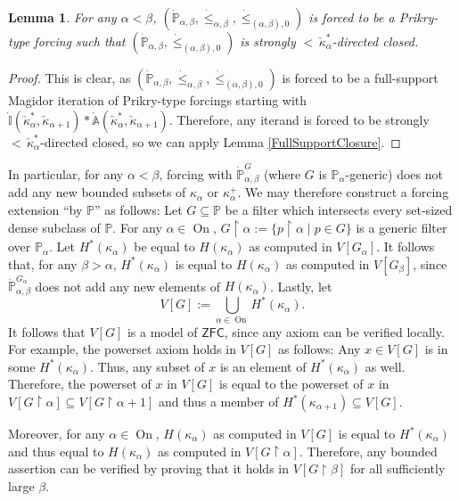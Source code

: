 \documentclass[a4paper]{amsart}
\theoremstyle{definition}
\theoremstyle{remark}
\theoremstyle{plain}
\newtheorem{mylem}[mydef]{Lemma}
\numberwithin{mydef}{section}
\DeclareMathOperator{\On}{On}
\newcommand{\dA}{\mathbb{A}}
\newcommand{\dI}{\mathbb{I}}
\newcommand{\dP}{\mathbb{P}}
\newcommand{\uhr}{\upharpoonright}
\newcommand{\ZFC}{\mathsf{ZFC}}
\begin{document}
	\begin{mylem}\label{TailClosure}
		For any $\alpha<\beta$, $(\dot{\dP}_{\alpha,\beta},\dot{\leq}_{\alpha,\beta},\dot{\leq}_{(\alpha,\beta),0})$ is forced to be a Prikry-type forcing such that $(\dot{\dP}_{\alpha,\beta},\dot{\leq}_{(\alpha,\beta),0})$ is strongly ${<}\,\check{\kappa}_{\alpha}^*$-directed closed.
	\end{mylem}
	
	\begin{proof}
		This is clear, as $(\dot{\dP}_{\alpha,\beta},\dot{\leq}_{\alpha,\beta},\dot{\leq}_{(\alpha,\beta),0})$ is forced to be a full-support Magidor iteration of Prikry-type forcings starting with $\dot{\dI}(\check{\kappa}_{\alpha}^*,\check{\kappa}_{\alpha+1})*\dot{\dA}(\check{\kappa}_{\alpha}^*,\check{\kappa}_{\alpha+1})$. Therefore, any iterand is forced to be strongly ${<}\,\check{\kappa}_{\alpha}^*$-directed closed, so we can apply Lemma \ref{FullSupportClosure}.
	\end{proof}
	
	In particular, for any $\alpha<\beta$, forcing with $\dot{\dP}_{\alpha,\beta}^G$ (where $G$ is $\dP_{\alpha}$-generic) does not add any new bounded subsets of $\kappa_{\alpha}$ or $\kappa_{\alpha}^+$. We may therefore construct a forcing extension ``by $\dP$'' as follows: Let $G\subseteq\dP$ be a filter which intersects every set-sized dense subclass of $\dP$. For any $\alpha\in\On$, $G\uhr\alpha:=\{p\uhr\alpha\;|\;p\in G\}$ is a generic filter over $\dP_{\alpha}$. Let $H^*(\kappa_{\alpha})$ be equal to $H(\kappa_{\alpha})$ as computed in $V[G_{\alpha}]$. It follows that, for any $\beta>\alpha$, $H^*(\kappa_{\alpha})$ is equal to $H(\kappa_{\alpha})$ as computed in $V[G_{\beta}]$, since $\dot{\dP}_{\alpha,\beta}^{G_{\alpha}}$ does not add any new elements of $H(\kappa_{\alpha})$. Lastly, let
	$$V[G]:=\bigcup_{\alpha\in\On}H^*(\kappa_{\alpha}).$$
	It follows that $V[G]$ is a model of $\ZFC$, since any axiom can be verified locally. For example, the powerset axiom holds in $V[G]$ as follows: Any $x\in V[G]$ is in some $H^*(\kappa_{\alpha})$. Thus, any subset of $x$ is an element of $H^*(\kappa_{\alpha})$ as well. Therefore, the powerset of $x$ in $V[G]$ is equal to the powerset of $x$ in $V[G\uhr\alpha]\subseteq V[G\uhr\alpha+1]$ and thus a member of $H^*(\kappa_{\alpha+1})\subseteq V[G]$.
	
	Moreover, for any $\alpha\in\On$, $H(\kappa_{\alpha})$ as computed in $V[G]$ is equal to $H^*(\kappa_{\alpha})$ and thus equal to $H(\kappa_{\alpha})$ as computed in $V[G\uhr\alpha]$. Therefore, any bounded assertion can be verified by proving that it holds in $V[G\uhr\beta]$ for all sufficiently large $\beta$.
	
\end{document}
